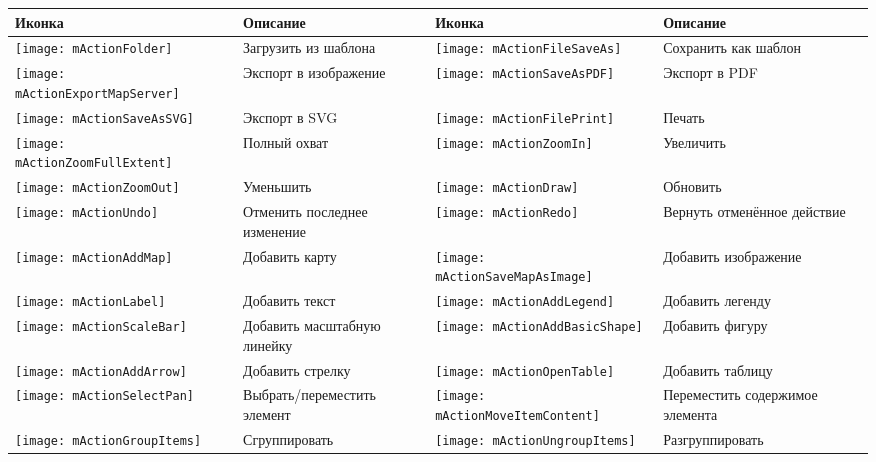 \begin{table}[h]
\centering\small
\renewcommand{\arraystretch}{2}
 \begin{tabular}{|m{1cm}|m{5.4cm}|m{1cm}|m{5.4cm}|}
 \hline \textbf{Иконка} & \textbf{Описание} & \textbf{Иконка} &
 \textbf{Описание} \\
 \hline \texttt{[image: mActionFolder]}
 & Загрузить из шаблона &
 \texttt{[image: mActionFileSaveAs]} & Сохранить как шаблон \\
 \hline \texttt{[image: mActionExportMapServer]}
 & Экспорт в изображение &
 \texttt{[image: mActionSaveAsPDF]} & Экспорт в PDF \\
 \hline \texttt{[image: mActionSaveAsSVG]} & Экспорт в SVG
 & \texttt{[image: mActionFilePrint]}
 & Печать \\
 \hline \texttt{[image: mActionZoomFullExtent]} & Полный
 охват & \texttt{[image: mActionZoomIn]} & Увеличить \\
 \hline \texttt{[image: mActionZoomOut]} & Уменьшить &
 \texttt{[image: mActionDraw]} & Обновить \\
 \hline \texttt{[image: mActionUndo]} & Отменить последнее изменение &
 \texttt{[image: mActionRedo]} & Вернуть отменённое действие \\
 \hline \texttt{[image: mActionAddMap]} & Добавить
 карту & \texttt{[image: mActionSaveMapAsImage]}
 & Добавить изображение \\
 \hline \texttt{[image: mActionLabel]} & Добавить текст
 & \texttt{[image: mActionAddLegend]} & Добавить
 легенду \\
 \hline \texttt{[image: mActionScaleBar]} & Добавить
 масштабную линейку & \texttt{[image: mActionAddBasicShape]}
 & Добавить фигуру \\
 \hline \texttt{[image: mActionAddArrow]} & Добавить
 стрелку & \texttt{[image: mActionOpenTable]} & Добавить
 таблицу \\
 \hline \texttt{[image: mActionSelectPan]} & Выбрать/переместить
 элемент &
 \texttt{[image: mActionMoveItemContent]} & Переместить
 содержимое элемента \\
 \hline \texttt{[image: mActionGroupItems]} & Сгруппировать &
 \texttt{[image: mActionUngroupItems]} & Разгруппировать \\

\end{tabular}
\end{table}
